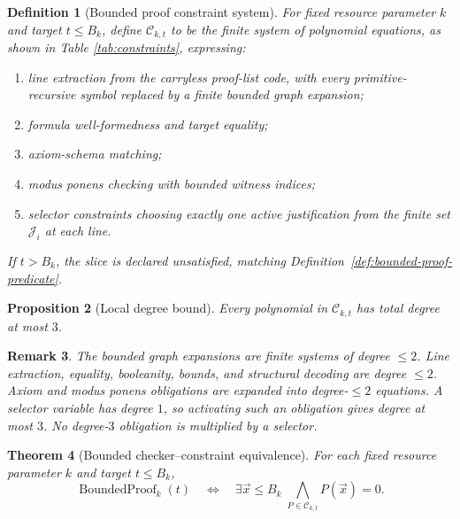 \documentclass[letterpaper,10pt]{article}
\theoremstyle{upright}
\theoremstyle{upright}
\newtheorem{theorem}{Theorem}[section]
\newtheorem{remark}[theorem]{Remark}
\newtheorem{definition}[theorem]{Definition}
\newtheorem{proposition}[theorem]{Proposition}
\begin{document}
\begin{definition}[Bounded proof constraint system]
\label{def:proof-constraint-system}
	For fixed resource parameter $k$ and target $t\leq B_k$, define $\mathcal{C}_{k,t}$ to be the finite system of polynomial equations, as shown in Table \ref{tab:constraints}, expressing:
	\begin{enumerate}[label=\textnormal{(\roman*)}]
		\item line extraction from the carryless proof-list code, with every primitive-recursive symbol replaced by a finite bounded graph expansion;
		\item formula well-formedness and target equality;
		\item axiom-schema matching;
		\item modus ponens checking with bounded witness indices;
		\item selector constraints choosing exactly one active justification from the finite set $\mathcal{J}_i$ at each line.
	\end{enumerate}
	If $t>B_k$, the slice is declared unsatisfied, matching Definition~\ref{def:bounded-proof-predicate}.
\end{definition}

\begin{proposition}[Local degree bound]
\label{prop:global-degree-bound}
	Every polynomial in $\mathcal{C}_{k,t}$ has total degree at most $3$.
\end{proposition}

\begin{remark}
	The bounded graph expansions are finite systems of degree $\leq 2$. Line extraction, equality, booleanity, bounds, and structural decoding are degree $\leq 2$. Axiom and modus ponens obligations are expanded into degree-$\leq 2$ equations. A selector variable has degree $1$, so activating such an obligation gives degree at most $3$. No degree-$3$ obligation is multiplied by a selector.
\end{remark}

\begin{theorem}[Bounded checker--constraint equivalence]
\label{thm:checker-constraint-equivalence}
	For each fixed resource parameter $k$ and target $t\leq B_k$,
	\begin{equation}
		\operatorname{BoundedProof}_k(t)
		\quad\Longleftrightarrow\quad
		\exists\vec{x}\leq B_k\;\bigwedge_{P\in\mathcal{C}_{k,t}}P(\vec{x})=0.
	\end{equation}
\end{theorem}
\end{document}
